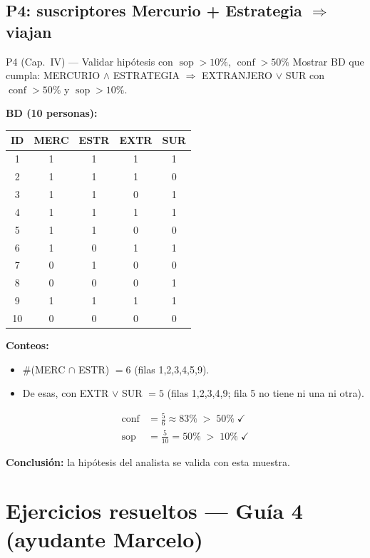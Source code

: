 \documentclass[11pt,a4paper]{article}
\newcommand{\conf}{\operatorname{conf}}
\newcommand{\sop}{\operatorname{sop}}
\begin{document}
\subsection{P4: suscriptores Mercurio + Estrategia $\Rightarrow$ viajan}

\begin{ejerciciobox}{P4 (Cap.\ IV) — Validar hipótesis con $\sop > 10\%$, $\conf > 50\%$}
Mostrar BD que cumpla: MERCURIO $\wedge$ ESTRATEGIA $\Rightarrow$ EXTRANJERO $\vee$ SUR
con $\conf > 50\%$ y $\sop > 10\%$.
\end{ejerciciobox}

\textbf{BD (10 personas):}

\begin{center}
\begin{tabular}{@{}ccccc@{}}
\toprule
ID & MERC & ESTR & EXTR & SUR \\
\midrule
1 & 1 & 1 & 1 & 1 \\
2 & 1 & 1 & 1 & 0 \\
3 & 1 & 1 & 0 & 1 \\
4 & 1 & 1 & 1 & 1 \\
5 & 1 & 1 & 0 & 0 \\
6 & 1 & 0 & 1 & 1 \\
7 & 0 & 1 & 0 & 0 \\
8 & 0 & 0 & 0 & 1 \\
9 & 1 & 1 & 1 & 1 \\
10& 0 & 0 & 0 & 0 \\
\bottomrule
\end{tabular}
\end{center}

\textbf{Conteos:}
\begin{itemize}
    \item $\#$(MERC $\cap$ ESTR) $= 6$ (filas 1,2,3,4,5,9).
    \item De esas, con EXTR $\vee$ SUR $= 5$ (filas 1,2,3,4,9; fila 5 no tiene ni una ni otra).
\end{itemize}

\begin{align*}
\conf &= \frac{5}{6} \approx 83\% \;>\; 50\% \;\checkmark \\
\sop  &= \frac{5}{10} = 50\% \;>\; 10\% \;\checkmark
\end{align*}

\textbf{Conclusión:} la hipótesis del analista se valida con esta muestra.

\section{Ejercicios resueltos — Guía 4 (ayudante Marcelo)}
\end{document}
